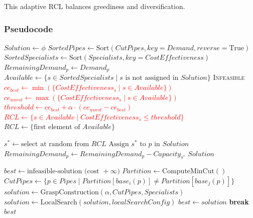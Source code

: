 \documentclass{article}
\begin{document}
This adaptive RCL balances greediness and diversification.

\subsubsection{Pseudocode}

\begin{algorithm}[H]
\renewcommand{\thealgorithm}{}
\caption{GRASP Construction Phase}
\begin{algorithmic}
\State $Solution \gets \phi$
\State $SortedPipes \gets \text{Sort}(CutPipes, key=Demand, reverse=\text{True})$
\State $SortedSpecialists \gets \text{Sort}(Specialists, key=CostEffectiveness)$
\Statex
{}
    \State $RemainingDemand_p \gets Demand_p$
        \State $Available \gets \{s \in SortedSpecialists \mid s \text{ is not assigned in } Solution\}$
            \State \Return \textsc{Infeasible}
        \EndIf
        \Statex
        \State \textcolor{red}{$ce_{best} \gets \min(\{CostEffectiveness_s \mid s \in Available\})$}
        \State \textcolor{red}{$ce_{worst} \gets \max(\{CostEffectiveness_s \mid s \in Available\})$}
        \State \textcolor{red}{$threshold \gets ce_{best} + \alpha \cdot (ce_{worst} - ce_{best})$}
        \State \textcolor{red}{$RCL \gets \{s \in Available \mid CostEffectiveness_s \leq threshold\}$}
        \Statex
            \State $RCL \gets \{\text{first element of } Available\}$
        \EndIf

        \State $s^* \gets \text{select at random from } RCL$
        \State $\text{Assign } s^* \text{ to } p \text{ in } Solution$
        \State $RemainingDemand_p \gets RemainingDemand_p - Capacity_{s^*}$
    \EndWhile
\EndFor
\Statex
\State \Return $Solution$
\EndFunction
\end{algorithmic}
\end{algorithm}

\begin{algorithm}[H]
\renewcommand{\thealgorithm}{}
\caption{GRASP Main Loop}
\begin{algorithmic}
    \State $best \gets \text{infeasible-solution (cost } +\infty)$
    \State $Partition \gets \text{ComputeMinCut}()$ 
    \State $CutPipes \gets \{p \in Pipes \mid Partition[base_i(p)] \neq Partition[base_j(p)]\}$
    \Statex
        \State $solution \gets \text{GraspConstruction}(\alpha, CutPipes, Specialists)$
        \Statex
            \State $solution \gets \text{LocalSearch}(solution, localSearchConfig)$
        \EndIf
            \State $best \gets solution$
        \EndIf
        \Statex
         \textbf{break}
        \EndIf
    \EndFor
    \Statex
    \State \Return $best$
\EndFunction
\end{algorithmic}
\end{algorithm}
\end{document}
